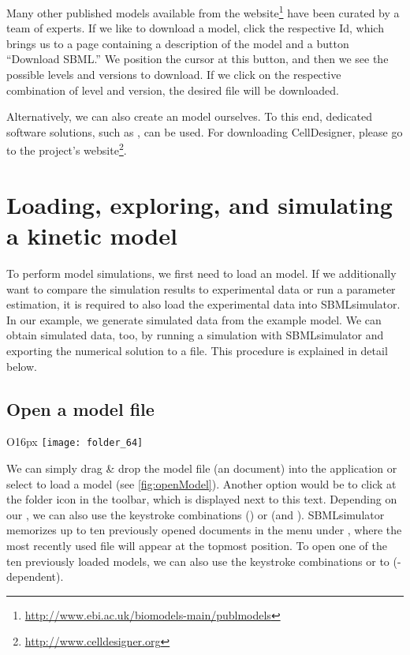 Many other published models available from the \BioModels website\footnote{\url{http://www.ebi.ac.uk/biomodels-main/publmodels}} have been curated by a team of experts.
If we like to download a model, click the respective \ac{Id}, which brings us to a page containing a description of the model and a button ``Download SBML.'' 
We position the cursor at this button, and then we see the possible \SBML levels and versions to download.
If we click on the respective combination of level and version, the desired \SBML file will be downloaded.

Alternatively, we can also create an \SBML model ourselves.
To this end, dedicated software solutions, such as \CellDesigner \citep{Funahashi2008}, can be used.
For downloading CellDesigner, please go to the project's website\footnote{\url{http://www.celldesigner.org}}.

\section{Loading, exploring, and simulating a kinetic model}

To perform model simulations, we first need to load an \SBML model. 
If we additionally want to compare the simulation results to experimental data or run a parameter estimation, it is required to also load the experimental data into SBMLsimulator.
In our example, we generate simulated data from the example model.
We can obtain simulated data, too, by running a simulation with SBMLsimulator and exporting the numerical solution to a \CSV file.
This procedure is explained in detail below.

\subsection{Open a model file}
\begin{wrapfigure}{O}{16px}
\vspace{\wrapfigspace}
\texttt{[image: folder\_64]}
\end{wrapfigure}
We can simply drag \& drop the model file (an \SBML document) into the application or select   to load a model (see \cref{fig:openModel}).
Another option would be to click at the folder icon in the toolbar, which is displayed next to this text.
Depending on our \OS, we can also use the keystroke combinations  (\MacOSX) or  (\Linux and \Windows).
SBMLsimulator memorizes up to ten previously opened \SBML documents in the menu under , where the most recently used file will appear at the topmost position.
To open one of the ten previously loaded models, we can also use the keystroke combinations \keys{\Altmac} or  to  (\OS-dependent).

